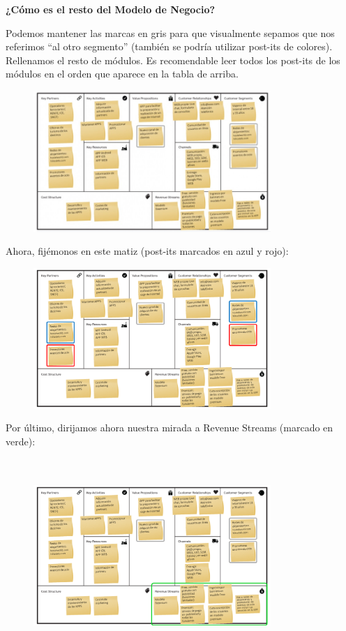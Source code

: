\documentclass[a4paper,12pt,twocolumn]{article}
\begin{document}
\textbf{¿Cómo es el resto del Modelo de Negocio?}
\item Podemos mantener las marcas en gris para que visualmente sepamos que nos referimos “al otro segmento” (también se podría utilizar post-its de colores). Rellenamos el resto de módulos. Es recomendable leer todos los post-its de los módulos en el orden que aparece en la tabla de arriba.
\begin{figure}[h!]
\centering
\includegraphics[width=9cm]{./Imagenes/img19}
\caption{\label{fig:01}}
\end{figure}
\item Ahora, fijémonos en este matiz (post-its marcados en azul y rojo):

\begin{figure}[h!]
\centering
\includegraphics[width=9cm]{./Imagenes/img21}
\caption{\label{fig:01}}
\end{figure}

\item Por último, dirijamos ahora nuestra mirada a Revenue Streams (marcado en verde):
\\
\textbf{}
\\
\\
\begin{figure}[h!]
\centering
\includegraphics[width=9cm]{./Imagenes/img20}
\caption{\label{fig:01}}
\end{figure}
\end{document}
